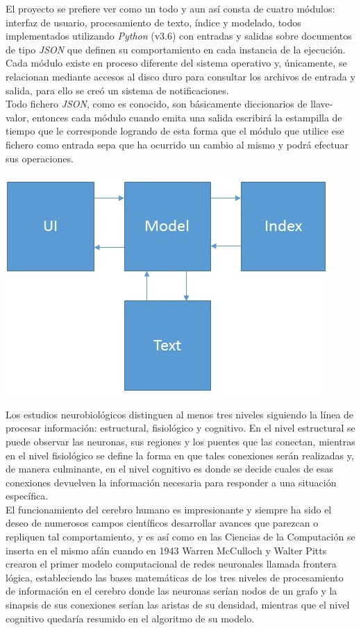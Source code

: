 \documentclass{llncs}
\begin{document}
El proyecto se prefiere ver como un todo y aun as\'i consta de cuatro m\'odulos: interfaz de usuario, procesamiento de texto,
\'indice y modelado, todos implementados utilizando {\textit{Python}} (v3.6) con entradas y salidas sobre documentos de tipo
 {\textit{JSON}} que definen su comportamiento en cada instancia de la ejecuci\'on. \\
Cada m\'odulo existe en proceso diferente del sistema operativo y, \'unicamente, se relacionan mediante accesos al disco duro
para consultar los archivos de entrada y salida, para ello se cre\'o un sistema de notificaciones.\\
Todo fichero {\textit{JSON}}, como es conocido, son b\'asicamente diccionarios de llave-valor, entonces cada m\'odulo cuando
emita una salida escribir\'a la estampilla de tiempo que le corresponde logrando de esta forma que el m\'odulo que utilice ese
fichero como entrada sepa que ha ocurrido un cambio al mismo y podr\'a efectuar sus operaciones.

{\includegraphics[]{structure}}
{\hfil{}}

Los estudios neurobiol\'ogicos distinguen al menos tres niveles siguiendo la l\'inea de procesar informaci\'on: estructural,
fisiol\'ogico y cognitivo. En el nivel estructural se puede observar las neuronas, sus regiones y los puentes que las conectan,
mientras en el nivel fisiol\'ogico se define la forma en que tales conexiones ser\'an realizadas y, de manera culminante, en
el nivel cognitivo es donde se decide cuales de esas conexiones devuelven la informaci\'on necesaria para responder a una
situaci\'on espec\'ifica. \\

El funcionamiento del cerebro humano es impresionante y siempre ha sido el deseo de numerosos campos cient\'ificos
desarrollar avances que parezcan o repliquen tal comportamiento, y es as\'i como en las Ciencias de la Computaci\'on
se inserta en el mismo af\'an cuando en 1943 \cite{foundations} Warren McCulloch y Walter Pitts crearon el primer modelo computacional
de redes neuronales llamada frontera l\'ogica, estableciendo las bases matem\'aticas de los tres niveles de procesamiento
de informaci\'on en el cerebro donde las neuronas ser\'ian nodos de un grafo y la sinapsis de sus conexiones ser\'ian las
aristas de su densidad, mientras que el nivel cognitivo quedar\'ia resumido en el algoritmo de su mode\-lo. \\
\end{document}
